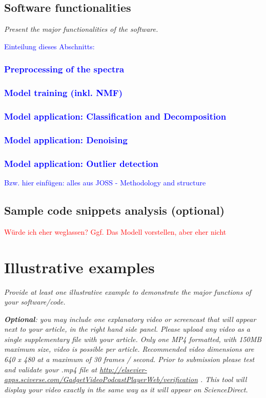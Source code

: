 \documentclass[preprint,12pt, a4paper]{elsarticle}
\begin{document}
 \subsection{Software functionalities}
\textit{Present the major functionalities of the software.}
\textcolor{blue}{
Einteilung dieses Abschnitts:
\subsubsection{Preprocessing of the spectra}
\subsubsection{Model training (inkl. NMF)}
\subsubsection{Model application: Classification and Decomposition}
\subsubsection{Model application: Denoising}
\subsubsection{Model application: Outlier detection}
Bzw. hier einfügen: alles aus JOSS - Methodology and structure
}
  
\subsection{Sample code snippets analysis (optional)}
\textcolor{red}{Würde ich eher weglassen? Ggf. Das Modell vorstellen, aber eher nicht}

\section{Illustrative examples}

\textit{Provide at least one illustrative example to demonstrate the major
functions of your software/code.}

\textit{\textbf{Optional}: you may include one explanatory  video or screencast that will appear next to your article, in the right hand side panel. Please upload any video as a single supplementary file with your article. Only one MP4 formatted, with 150MB maximum size, video is possible per article. Recommended video dimensions are 640 x 480 at a maximum of 30 frames / second. Prior to submission please test and validate your .mp4 file at  \url{http://elsevier-apps.sciverse.com/GadgetVideoPodcastPlayerWeb/verification} . This tool will display your video exactly in the same way as it will appear on ScienceDirect. }
\end{document}
